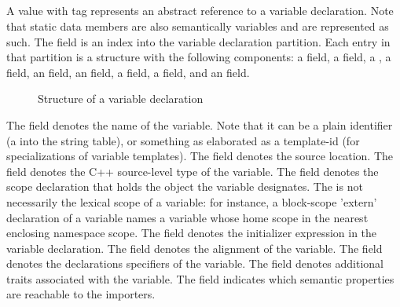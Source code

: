 
\subsection{} 
\label{sec:ifc:DeclSort:Variable}

A  value with tag  represents an abstract
reference to a variable declaration.  Note that static data members are also
semantically variables and are represented as such.
The  field is an index into the variable declaration partition.
Each entry in that partition is a structure with the following components:
a  field, a  field, a , a  field,
an  field, an  field, a  field, a 
field, and an  field.
%
\begin{figure}[H]
	\centering
	\caption{Structure of a variable declaration}
	\label{fig:ifc-variable-decl-structure}
\end{figure}
%
The  field denotes the name of the variable.  Note that it can be a plain identifier (a  into the string table), or something
as elaborated as a template-id (for specializations of variable templates).
The  field denotes the source location.
The  field denotes the C++ source-level type of the variable.
The  field denotes the scope declaration that holds the object the variable designates.  The  
is not necessarily the lexical scope of a variable: for instance, a block-scope 'extern' declaration of a variable names a variable whose 
home scope in the nearest enclosing namespace scope.
The  field denotes the initializer expression in the variable declaration.
The  field denotes the alignment of the variable.
The  field denotes the declarations specifiers of the variable.
The  field denotes additional traits associated with the variable.
The  field indicates which semantic properties are reachable 
to the importers.


